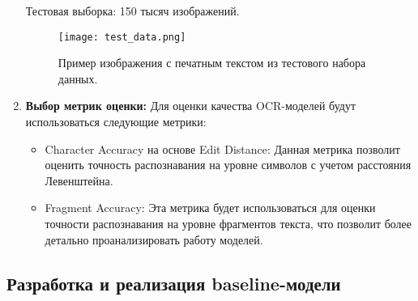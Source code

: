 \begin{enumerate}
   Тестовая выборка: 150 тысяч изображений.

   \begin{figure}[H]
     \centering
     \texttt{[image: test\_data.png]}
     \caption{Пример изображения с печатным текстом из тестового набора данных.}
   \end{figure}
   

   \item \textbf{Выбор метрик оценки:}
   Для оценки качества OCR-моделей будут использоваться следующие метрики:
   \begin{itemize}
     \item Character Accuracy на основе Edit Distance: Данная метрика позволит оценить точность распознавания на уровне символов с учетом расстояния Левенштейна.
     \item Fragment Accuracy: Эта метрика будет использоваться для оценки точности распознавания на уровне фрагментов текста, что позволит более детально проанализировать работу моделей.
   \end{itemize}
\end{enumerate}

\subsection{Разработка и реализация baseline-модели}

